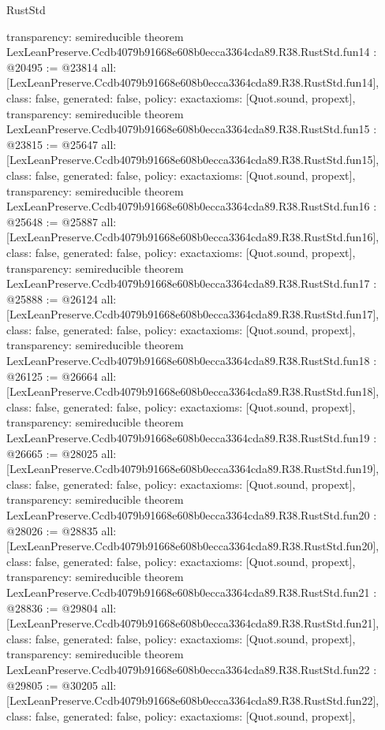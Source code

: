 \begin{lexlean}{RustStd}
\begin{coremodule}
{  transparency: semireducible
}
theorem LexLeanPreserve.Ccdb4079b91668e608b0ecca3364cda89.R38.RustStd.fun14 : @20495 := @23814 {
  all: [LexLeanPreserve.Ccdb4079b91668e608b0ecca3364cda89.R38.RustStd.fun14],
  class: false,
  generated: false,
  policy: exact{axioms: [Quot.sound, propext]},
  transparency: semireducible
}
theorem LexLeanPreserve.Ccdb4079b91668e608b0ecca3364cda89.R38.RustStd.fun15 : @23815 := @25647 {
  all: [LexLeanPreserve.Ccdb4079b91668e608b0ecca3364cda89.R38.RustStd.fun15],
  class: false,
  generated: false,
  policy: exact{axioms: [Quot.sound, propext]},
  transparency: semireducible
}
theorem LexLeanPreserve.Ccdb4079b91668e608b0ecca3364cda89.R38.RustStd.fun16 : @25648 := @25887 {
  all: [LexLeanPreserve.Ccdb4079b91668e608b0ecca3364cda89.R38.RustStd.fun16],
  class: false,
  generated: false,
  policy: exact{axioms: [Quot.sound, propext]},
  transparency: semireducible
}
theorem LexLeanPreserve.Ccdb4079b91668e608b0ecca3364cda89.R38.RustStd.fun17 : @25888 := @26124 {
  all: [LexLeanPreserve.Ccdb4079b91668e608b0ecca3364cda89.R38.RustStd.fun17],
  class: false,
  generated: false,
  policy: exact{axioms: [Quot.sound, propext]},
  transparency: semireducible
}
theorem LexLeanPreserve.Ccdb4079b91668e608b0ecca3364cda89.R38.RustStd.fun18 : @26125 := @26664 {
  all: [LexLeanPreserve.Ccdb4079b91668e608b0ecca3364cda89.R38.RustStd.fun18],
  class: false,
  generated: false,
  policy: exact{axioms: [Quot.sound, propext]},
  transparency: semireducible
}
theorem LexLeanPreserve.Ccdb4079b91668e608b0ecca3364cda89.R38.RustStd.fun19 : @26665 := @28025 {
  all: [LexLeanPreserve.Ccdb4079b91668e608b0ecca3364cda89.R38.RustStd.fun19],
  class: false,
  generated: false,
  policy: exact{axioms: [Quot.sound, propext]},
  transparency: semireducible
}
theorem LexLeanPreserve.Ccdb4079b91668e608b0ecca3364cda89.R38.RustStd.fun20 : @28026 := @28835 {
  all: [LexLeanPreserve.Ccdb4079b91668e608b0ecca3364cda89.R38.RustStd.fun20],
  class: false,
  generated: false,
  policy: exact{axioms: [Quot.sound, propext]},
  transparency: semireducible
}
theorem LexLeanPreserve.Ccdb4079b91668e608b0ecca3364cda89.R38.RustStd.fun21 : @28836 := @29804 {
  all: [LexLeanPreserve.Ccdb4079b91668e608b0ecca3364cda89.R38.RustStd.fun21],
  class: false,
  generated: false,
  policy: exact{axioms: [Quot.sound, propext]},
  transparency: semireducible
}
theorem LexLeanPreserve.Ccdb4079b91668e608b0ecca3364cda89.R38.RustStd.fun22 : @29805 := @30205 {
  all: [LexLeanPreserve.Ccdb4079b91668e608b0ecca3364cda89.R38.RustStd.fun22],
  class: false,
  generated: false,
  policy: exact{axioms: [Quot.sound, propext]},
}
\end{coremodule}
\end{lexlean}
